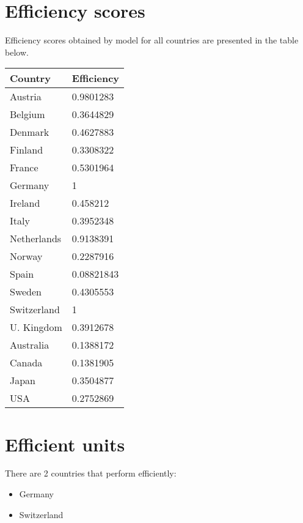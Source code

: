 \documentclass[11pt]{article}
\begin{document}
\section{Efficiency scores}
Efficiency scores obtained by model for all countries are presented in the table below.
\begin{center}
	\begin{tabular}{| m{6cm} | m{6cm} |}
	\hline
	\textbf{Country} & \textbf{Efficiency} \\
	\hline \hline
	Austria & 0.9801283\\
	\hline
	Belgium & 0.3644829\\
	\hline
	Denmark & 0.4627883\\
	\hline
	Finland & 0.3308322\\
	\hline
	France & 0.5301964\\
	\hline
	Germany & 1\\
	\hline
	Ireland & 0.458212\\
	\hline
	Italy & 0.3952348\\
	\hline
	Netherlands & 0.9138391\\
	\hline
	Norway & 0.2287916\\
	\hline
	Spain & 0.08821843\\
	\hline
	Sweden & 0.4305553\\
	\hline
	Switzerland & 1\\
	\hline
	U. Kingdom & 0.3912678\\
	\hline
	Australia & 0.1388172\\
	\hline
	Canada & 0.1381905\\
	\hline
	Japan & 0.3504877\\
	\hline
	USA & 0.2752869\\
	\hline
	\end{tabular}
\end{center}
%
%
\section{Efficient units}
There are 2 countries that perform efficiently:
\begin{itemize}
	\item Germany
	\item Switzerland
\end{itemize}
%
\pagebreak
%
\end{document}
